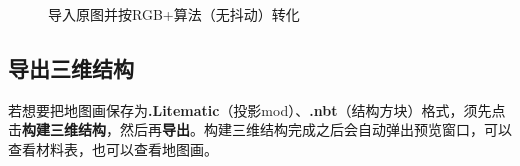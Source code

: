\documentclass[UTF8]{ctexart}
\begin{document}
    \begin{figure}[htbp]
        \centering
        \setcounter{subfigure}{0}
        \caption{导入原图并按RGB+算法（无抖动）转化}
    \end{figure}
    
    \subsection{导出三维结构}
    若想要把地图画保存为\textbf{.Litematic}（投影mod）、\textbf{.nbt}（结构方块）格式，须先点击\textbf{构建三维结构}，然后再\textbf{导出}。构建三维结构完成之后会自动弹出预览窗口，可以查看材料表，也可以查看地图画。
\end{document}
